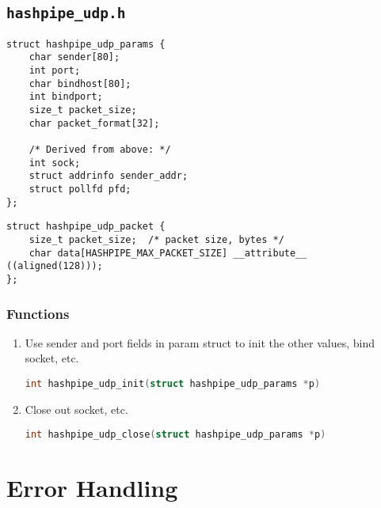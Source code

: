 \documentclass[12pt]{article}
\def\clst{\lstinline[basicstyle=\ttfamily,breaklines=true,language=C]}
\begin{document}
\subsection{\tt hashpipe\_udp.h}

\begin{center}
\begin{lstlisting}
struct hashpipe_udp_params {
    char sender[80];
    int port;      
    char bindhost[80]; 
    int bindport;     
    size_t packet_size;
    char packet_format[32];

    /* Derived from above: */
    int sock;                      
    struct addrinfo sender_addr;  
    struct pollfd pfd;           
};
\end{lstlisting}
\end{center}

\begin{center}
\begin{lstlisting}
struct hashpipe_udp_packet {
    size_t packet_size;  /* packet size, bytes */
    char data[HASHPIPE_MAX_PACKET_SIZE] __attribute__ ((aligned(128)));
};
\end{lstlisting}
\end{center}

\subsubsection*{Functions}

\begin{enumerate}

\item 
Use sender and port fields in param struct to init
the other values, bind socket, etc.

\clst{int hashpipe_udp_init(struct hashpipe_udp_params *p)}

\item Close out socket, etc.

\clst{int hashpipe_udp_close(struct hashpipe_udp_params *p)}

\end{enumerate}

\section{Error Handling}
\end{document}
